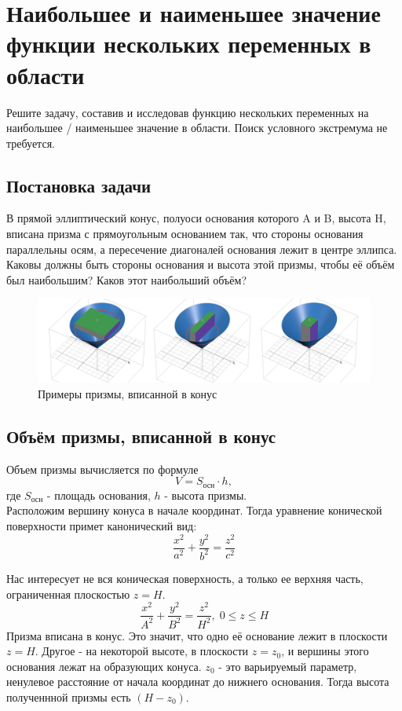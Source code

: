 \section{Наибольшее и наименьшее значение функции нескольких переменных в области}
Решите задачу, составив и исследовав функцию нескольких переменных на наибольшее / наименьшее значение в области. Поиск условного экстремума не требуется.



\subsection{Постановка задачи}
В прямой эллиптический конус, полуоси основания которого A и B,
высота H, вписана призма с прямоугольным основанием так, что
стороны основания параллельны осям, а пересечение диагоналей
основания лежит в центре эллипса. Каковы должны быть стороны
основания и высота этой призмы, чтобы её объём был наибольшим?
Каков этот наибольший объём?
\begin{figure}[H]
\centering
\includegraphics[width=1\textwidth]{img/ex.png}
\caption{Примеры призмы, вписанной в конус}
\end{figure}





\subsection{Объём призмы, вписанной в конус}
Объем призмы вычисляется по формуле
$$V = S_{\text{осн}} \cdot h,$$
где $S_{\text{осн}}$ - площадь основания, $h$ - высота призмы.\\
Расположим вершину конуса в начале координат. Тогда уравнение конической поверхности примет канонический вид:
$$
\frac{x^2}{a^2} + \frac{y^2}{b^2} = \frac{z^2}{c^2}
$$

Нас интересует не вся коническая поверхность, а только ее верхняя часть, ограниченная плоскостью $z = H$.
$$
\frac{x^2}{A^2} + \frac{y^2}{B^2} = \frac{z^2}{H^2}, \; 0 \leq z \leq H
$$
Призма вписана в конус. Это значит, что одно её основание лежит в плоскости $z = H$. Другое - на некоторой высоте, в плоскости $z = z_0$, и вершины этого основания лежат на образующих конуса. $z_0$ - это варьируемый параметр, ненулевое расстояние от начала координат до нижнего основания. Тогда высота полученнной призмы есть $(H - z_0)$.\\

